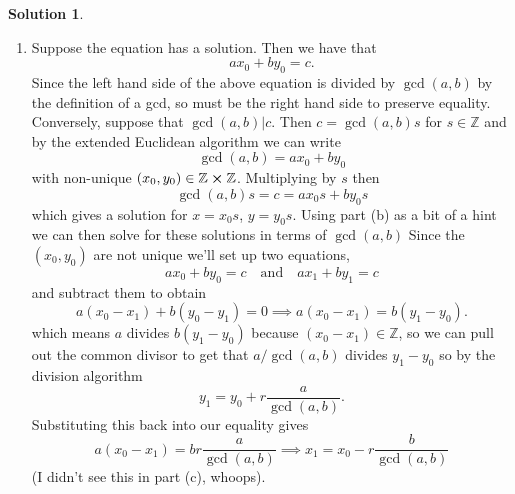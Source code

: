 \documentclass[10pt]{article}
\theoremstyle{definition}
\newtheorem{soln}{Solution}
\begin{document}
\begin{soln}
  \begin{enumerate}[label=(\alph*)]
    \item Suppose the equation has a solution. Then we have that
          $$ax_0+by_0=c.$$
          Since the left hand side of the above equation is divided by $\gcd(a,b)$ by the definition of a gcd, so must be the right hand side
          to preserve equality. Conversely, suppose that $\gcd(a,b)|c$. Then $c=\gcd(a,b)s$ for $s\in\mathbb{Z}$ and by the extended Euclidean algorithm we can write
          $$\gcd(a,b)=ax_0+by_0$$ with non-unique $(x_0,y_0)\in\mathbb{Z}\cross\mathbb{Z}$. Multiplying by $s$ then
          $$\gcd(a,b)s=c=ax_0 s+by_0 s$$ which gives a solution for $x=x_0s$, $y=y_0s$. Using part (b) as a bit of a hint we can then solve for these solutions in terms of $\gcd(a,b)$
          Since the $(x_0,y_0)$ are not unique we'll set up two equations,
          $$ax_0+by_0=c\quad\text{and}\quad ax_1+by_1=c$$
          and subtract them to obtain
          $$a(x_0-x_1)+b(y_0-y_1)=0\implies a(x_0-x_1)=b(y_1-y_0).$$
          which means $a$ divides $b(y_1-y_0)$ because $(x_0-x_1)\in\mathbb{Z}$, so we can pull out the common divisor
          to get that $a/\gcd(a,b)$ divides $y_1-y_0$ so by the division algorithm $$y_1=y_0+r\frac{a}{\gcd(a,b)}.$$
          Substituting this back into our equality gives
          $$a(x_0-x_1)=br\frac{a}{\gcd(a,b)}\implies x_1=x_0-r\frac{b}{\gcd(a,b)}$$
          (I didn't see this in part (c), whoops).


\end{enumerate}
\end{soln}
\end{document}
